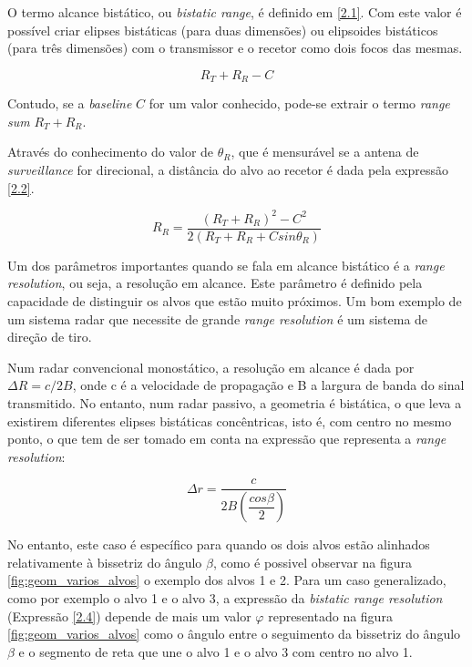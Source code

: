 O termo alcance bistático, ou \textit{bistatic range}, é definido em \ref{2.1}. Com este valor é possível criar elipses bistáticas (para duas dimensões) ou elipsoides bistáticos (para três dimensões) com o transmissor e o recetor como dois focos das mesmas. \par

\begin{equation} \label{2.1}
R_{T}+R_{R}-C
\end{equation}

Contudo, se a \textit{baseline} $C$ for um valor conhecido, pode-se extrair o termo \textit{range sum} $R_{T}+R_{R}$. \par
Através do conhecimento do valor de $\theta_{R}$, que é mensurável se a antena de \textit{surveillance} for direcional, a distância do alvo ao recetor é dada pela expressão \ref{2.2}.

\begin{equation} \label{2.2}
R_{R}=\dfrac{\left(  R_{T}+R_{R}\right)^{2}-C^{2}}{2\left(  R_{T}+R_{R}+C sin\theta_{R}\right)}
\end{equation}


Um dos parâmetros importantes quando se fala em alcance bistático é a \textit{range resolution}, ou seja, a resolução em alcance. Este parâmetro é definido pela capacidade de distinguir os alvos que estão muito próximos. Um bom exemplo de um sistema radar que necessite de grande \textit{range resolution} é um sistema de direção de tiro. \par 

Num radar convencional monostático, a resolução em alcance é dada por $\Delta R=c/2B$, onde c é a velocidade de propagação e B a largura de banda do sinal transmitido. No entanto, num radar passivo, a geometria é bistática, o que leva a existirem diferentes elipses bistáticas concêntricas, isto é, com centro no mesmo ponto, o que tem de ser tomado em conta na expressão que representa a \textit{range resolution}:

\begin{equation} \label{2.3}
\Delta r=\dfrac{c}{2B\left( \dfrac{cos\beta}{2}\right)}
\end{equation}

No entanto, este caso é específico para quando os dois alvos estão alinhados relativamente à bissetriz do ângulo $\beta$, como é possivel observar na figura \ref{fig:geom_varios_alvos} o exemplo dos alvos 1 e 2. Para um caso generalizado, como por exemplo o alvo 1 e o alvo 3, a expressão da \textit{bistatic range resolution} (Expressão \ref{2.4}) depende de mais um valor $\varphi$ representado na figura \ref{fig:geom_varios_alvos} como o ângulo entre o seguimento da bissetriz do ângulo $\beta$ e o segmento de reta que une o alvo 1 e o alvo 3 com centro no alvo 1. 

